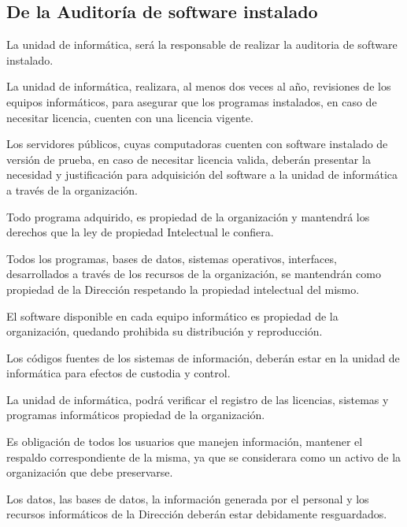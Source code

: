 \documentclass{book}
\begin{document}
            \subsection{De la Auditoría de software instalado}
                La unidad de informática, será la responsable de realizar la auditoria de software
                instalado.

                La unidad de informática, realizara, al menos dos veces al año, revisiones de los
                equipos informáticos, para asegurar que los programas instalados, en caso de necesitar
                licencia, cuenten con una licencia vigente.

                Los servidores públicos, cuyas computadoras cuenten con software instalado de
                versión de prueba, en caso de necesitar licencia valida, deberán presentar la necesidad y
                justificación para adquisición del software a la unidad de informática a través de la
                organización.

                Todo programa adquirido, es propiedad de la organización y mantendrá los derechos
                que la ley de propiedad Intelectual le confiera.

                Todos los programas, bases de datos, sistemas operativos, interfaces,
                desarrollados a través de los recursos de la organización, se mantendrán como propiedad de
                la Dirección respetando la propiedad intelectual del mismo.

                El software disponible en cada equipo informático es propiedad de la organización,
                quedando prohibida su distribución y reproducción.

                Los códigos fuentes de los sistemas de información, deberán estar en la unidad
                de informática para efectos de custodia y control.

                La unidad de informática, podrá verificar el registro de las licencias, sistemas y
                programas informáticos propiedad de la organización.

                Es obligación de todos los usuarios que manejen información, mantener el
                respaldo correspondiente de la misma, ya que se considerara como un activo de la
                organización que debe preservarse.

                Los datos, las bases de datos, la información generada por el personal y los
                recursos informáticos de la Dirección deberán estar debidamente resguardados.
            \
\end{document}
